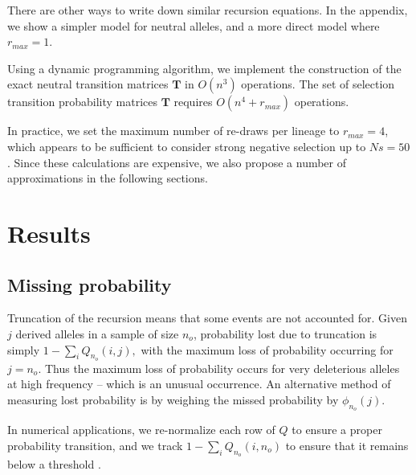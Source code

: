 \documentclass[review]{elsarticle}
\newcommand{\ra}{\rightarrow}
\newcommand{\sgcomment}[1]{{\color{red}{SG: #1}}}
\begin{document}
There are other ways to write down similar recursion equations. In the appendix, we show a simpler
model for neutral alleles, and a more direct model where $r_{max}=1$.

Using a dynamic programming algorithm, we implement the construction of the exact neutral transition
matrices $\mathbf{T}$ in $O(n^3)$ operations. The set of selection transition probability matrices
$\mathbf{T}$ requires $O(n^4+r_{max})$ operations.

In practice, we set the maximum number of re-draws per lineage to $r_{max}=4$, which appears to be
sufficient to consider strong negative selection up to $Ns=50$. Since these calculations are
expensive, we also propose a number of approximations in the following sections.


\section{Results}
\label{sec:results}

\subsection{Missing probability}

Truncation of the recursion means that some events are not accounted for. Given $j$ derived alleles
in a sample of size $n_o$, probability lost due to truncation is simply $1- \sum_i Q_{n_o}(i,j),$
with the maximum loss of probability occurring for $j= n_o$. Thus the maximum loss of probability
occurs for very deleterious alleles at high frequency -- which is an unusual occurrence. An
alternative method of measuring lost probability is by weighing the missed probability by
$\phi_{n_o}(j)$.

In numerical applications, we re-normalize each row of $Q$ to ensure a proper probability
transition, and we track $1- \sum_i Q_{n_o}(i,n_o)$ to ensure that it remains below a threshold
\sgcomment{What did we use?}.



\end{document}
